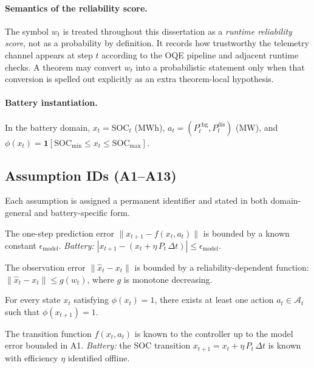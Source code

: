 \paragraph{Semantics of the reliability score.}
The symbol $w_t$ is treated throughout this dissertation as a
\emph{runtime reliability score}, not as a probability by definition.
It records how trustworthy the telemetry channel appears at step $t$
according to the OQE pipeline and adjacent runtime checks.  A theorem may
convert $w_t$ into a probabilistic statement only when that conversion is
spelled out explicitly as an extra theorem-local hypothesis.

\paragraph{Battery instantiation.}
In the battery domain, $x_t = \text{SOC}_t$ (MWh),
$a_t = (P_t^{\text{chg}}, P_t^{\text{dis}})$ (MW), and
$\phi(x_t) = \mathbf{1}[\text{SOC}_{\min} \le x_t \le \text{SOC}_{\max}]$.

\subsection{Assumption IDs (A1--A13)}

Each assumption is assigned a permanent identifier and stated in both
domain-general and battery-specific form.

\begin{assumption}
\label{assm:A1}
The one-step prediction error $\|x_{t+1} - f(x_t, a_t)\|$ is bounded
by a known constant $\epsilon_{\text{model}}$.
\emph{Battery:} $|x_{t+1} - (x_t + \eta\,P_t\,\Delta t)| \le \epsilon_{\text{model}}$.
\end{assumption}

\begin{assumption}
\label{assm:A2}
The observation error $\|\hat{x}_t - x_t\|$ is bounded by a
reliability-dependent function: $\|\hat{x}_t - x_t\| \le g(w_t)$,
where $g$ is monotone decreasing.
\end{assumption}

\begin{assumption}
\label{assm:A3}
For every state $x_t$ satisfying $\phi(x_t) = 1$, there exists at
least one action $a_t \in \mathcal{A}_t$ such that $\phi(x_{t+1}) = 1$.
\end{assumption}

\begin{assumption}
\label{assm:A4}
The transition function $f(x_t, a_t)$ is known to the controller up
to the model error bounded in A1.
\emph{Battery:} the SOC transition $x_{t+1} = x_t + \eta\,P_t\,\Delta t$
is known with efficiency $\eta$ identified offline.
\end{assumption}

